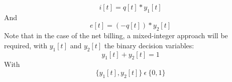 \begin{equation} \label{rvw1}
	i[t] = q[t]*y_1[t]
\end{equation}
And
\begin{equation} \label{rvw2}
	e[t] = (-q[t])*y_2[t]
\end{equation}
Note that in the case of the net billing, a mixed-integer approach will be required, with $y_1[t]$ and $y_2[t]$ the binary decision variables:
\begin{equation} \label{rvw3}
	y_1[t] + y_2[t] = 1
\end{equation}
With
\begin{equation} \label{rvw4}
\{y_1[t], y_2[t]\} \: \epsilon \: \{0,1\}
\end{equation}
